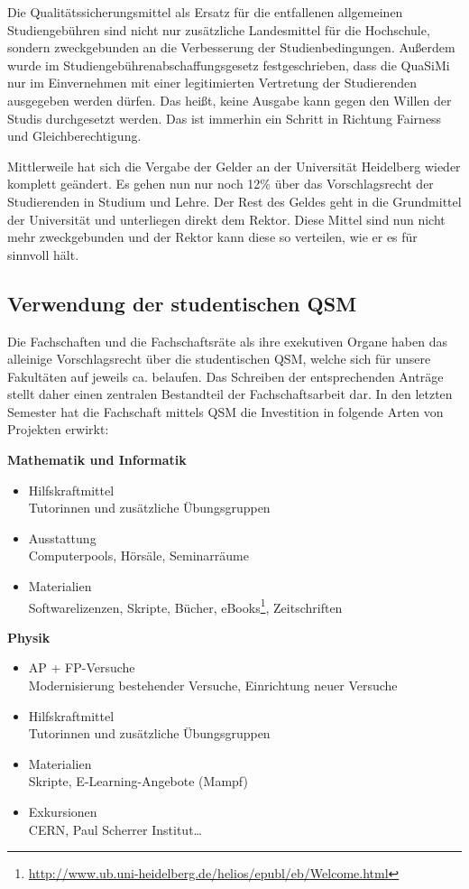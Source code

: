 Die Qualitätssicherungsmittel als Ersatz für die entfallenen allgemeinen Studiengebühren sind nicht nur zusätzliche Landesmittel für die Hochschule, sondern zweckgebunden an die Verbesserung der Studienbedingungen. Außerdem wurde im Studiengebührenabschaffungsgesetz festgeschrieben, dass die QuaSiMi nur im Einvernehmen mit einer legitimierten Vertretung der Studierenden ausgegeben werden dürfen. Das heißt, keine Ausgabe kann gegen den Willen der Studis durchgesetzt werden. Das ist immerhin ein Schritt in Richtung Fairness und Gleichberechtigung.

Mittlerweile hat sich die Vergabe der Gelder an der Universität Heidelberg wieder komplett geändert. Es gehen nun nur noch 12\% über das Vorschlagsrecht der Studierenden in Studium und Lehre. Der Rest des Geldes geht in die Grundmittel der Universität und unterliegen direkt dem Rektor. Diese Mittel sind nun nicht mehr zweckgebunden und der Rektor kann diese so verteilen, wie er es für sinnvoll hält. 

\subsection{Verwendung der studentischen QSM}
Die Fachschaften und die Fachschaftsräte als ihre exekutiven Organe haben das alleinige Vorschlagsrecht über die studentischen QSM, welche sich für unsere Fakultäten auf jeweils ca.  belaufen. Das Schreiben der entsprechenden Anträge stellt daher einen zentralen Bestandteil der Fachschaftsarbeit dar. In den letzten Semester hat die Fachschaft mittels QSM die Investition in folgende Arten von Projekten erwirkt:

\vspace{5mm}
\textbf{Mathematik und Informatik}
\begin{itemize}
\item {Hilfskraftmittel}\\ Tutorinnen und zusätzliche Übungsgruppen
\item {Ausstattung}\\ Computerpools, Hörsäle, Seminarräume
\item {Materialien}\\ Softwarelizenzen, Skripte, Bücher, eBooks\footnote{\url{http://www.ub.uni-heidelberg.de/helios/epubl/eb/Welcome.html}}, Zeitschriften
\end{itemize}

\vspace{5mm}
\textbf{Physik}
\begin{itemize}
\item {\gls{AP} + \gls{FP}-Versuche}\\
	Modernisierung bestehender Versuche, Einrichtung neuer Versuche
\item {Hilfskraftmittel}\\
	Tutorinnen und zusätzliche Übungsgruppen
\item {Materialien}\\
	Skripte, E-Learning-Angebote (Mampf)
\item {Exkursionen}\\
	CERN, Paul Scherrer Institut\dots
\end{itemize}

